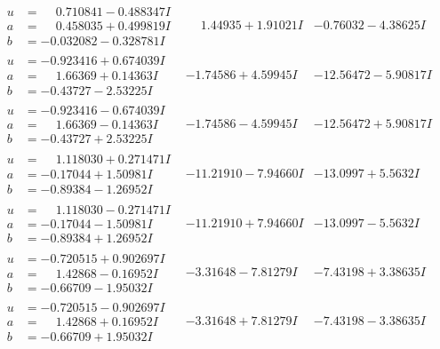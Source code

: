 \documentclass[1p]{elsarticle_modified}
\theoremstyle{definition}
\begin{document}
$$\begin{array}{c|c|c}
\begin{aligned}
u &= \phantom{-}0.710841 - 0.488347 I \\
a &= \phantom{-}0.458035 + 0.499819 I \\
b &= -0.032082 - 0.328781 I\end{aligned}
 & \phantom{-}1.44935 + 1.91021 I & -0.76032 - 4.38625 I \\ \hline\begin{aligned}
u &= -0.923416 + 0.674039 I \\
a &= \phantom{-}1.66369 + 0.14363 I \\
b &= -0.43727 - 2.53225 I\end{aligned}
 & -1.74586 + 4.59945 I & -12.56472 - 5.90817 I \\ \hline\begin{aligned}
u &= -0.923416 - 0.674039 I \\
a &= \phantom{-}1.66369 - 0.14363 I \\
b &= -0.43727 + 2.53225 I\end{aligned}
 & -1.74586 - 4.59945 I & -12.56472 + 5.90817 I \\ \hline\begin{aligned}
u &= \phantom{-}1.118030 + 0.271471 I \\
a &= -0.17044 + 1.50981 I \\
b &= -0.89384 - 1.26952 I\end{aligned}
 & -11.21910 - 7.94660 I & -13.0997 + 5.5632 I \\ \hline\begin{aligned}
u &= \phantom{-}1.118030 - 0.271471 I \\
a &= -0.17044 - 1.50981 I \\
b &= -0.89384 + 1.26952 I\end{aligned}
 & -11.21910 + 7.94660 I & -13.0997 - 5.5632 I \\ \hline\begin{aligned}
u &= -0.720515 + 0.902697 I \\
a &= \phantom{-}1.42868 - 0.16952 I \\
b &= -0.66709 - 1.95032 I\end{aligned}
 & -3.31648 - 7.81279 I & -7.43198 + 3.38635 I \\ \hline\begin{aligned}
u &= -0.720515 - 0.902697 I \\
a &= \phantom{-}1.42868 + 0.16952 I \\
b &= -0.66709 + 1.95032 I\end{aligned}
 & -3.31648 + 7.81279 I & -7.43198 - 3.38635 I \\ \hline\begin{aligned}

\end{aligned}
\end{array}$$
\end{document}
